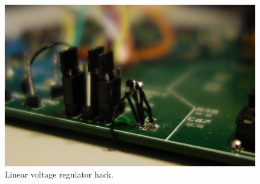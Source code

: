 \begin{figure}[H]
    \centering
    \includegraphics[scale=0.1]{figures/results/pcb/linear-regulator}
    \caption{Linear voltage regulator hack.}
    \label{fig:res:linreg}
\end{figure}
